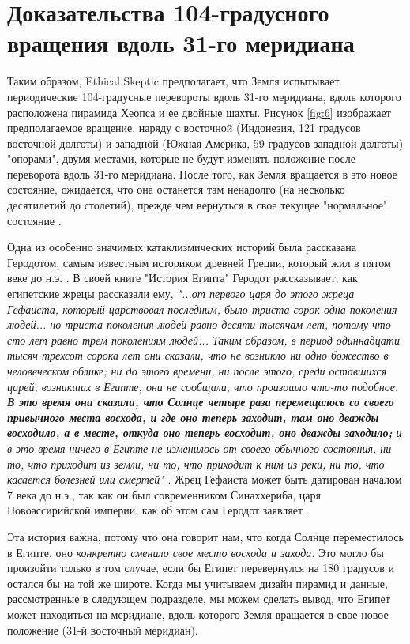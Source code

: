 \documentclass[10pt,twocolumn,letterpaper]{article}
\begin{document}
\section{Доказательства 104-градусного вращения вдоль 31-го меридиана}

Таким образом, Ethical Skeptic предполагает, что Земля испытывает периодические 104-градусные перевороты вдоль 31-го меридиана, вдоль которого расположена пирамида Хеопса и ее двойные шахты. Рисунок \ref{fig:6} изображает предполагаемое вращение, наряду с восточной (Индонезия, 121 градусов восточной долготы) и западной (Южная Америка, 59 градусов западной долготы) "опорами", двумя местами, которые не будут изменять положение после переворота вдоль 31-го меридиана. После того, как Земля вращается в это новое состояние, ожидается, что она останется там ненадолго (на несколько десятилетий до столетий), прежде чем вернуться в свое текущее "нормальное" состояние \cite{150}.

Одна из особенно значимых катаклизмических историй была рассказана Геродотом, самым известным историком древней Греции, который жил в пятом веке до н.э. \cite{31}. В своей книге "История Египта" Геродот рассказывает, как египетские жрецы рассказали ему, \textit{"...от первого царя до этого жреца Гефаиста, который царствовал последним, было триста сорок одна поколения людей... но триста поколения людей равно десяти тысячам лет, потому что сто лет равно трем поколениям людей... Таким образом, в период одиннадцати тысяч трехсот сорока лет они сказали, что не возникло ни одно божество в человеческом облике; ни до этого времени, ни после этого, среди оставшихся царей, возникших в Египте, они не сообщали, что произошло что-то подобное. \textbf{В это время они сказали, что Солнце четыре раза перемещалось со своего привычного места восхода, и где оно теперь заходит, там оно дважды восходило, а в месте, откуда оно теперь восходит, оно дважды заходило;} и в это время ничего в Египте не изменилось от своего обычного состояния, ни то, что приходит из земли, ни то, что приходит к ним из реки, ни то, что касается болезней или смертей"} \cite{32}. Жрец Гефаиста может быть датирован началом 7 века до н.э., так как он был современником Синаххериба, царя Новоассирийской империи, как об этом сам Геродот заявляет \cite{32,33,34}.

Эта история важна, потому что она говорит нам, что когда Солнце переместилось в Египте, оно \textit{конкретно сменило свое место восхода и захода}. Это могло бы произойти только в том случае, если бы Египет перевернулся на 180 градусов и остался бы на той же широте. Когда мы учитываем дизайн пирамид и данные, рассмотренные в следующем подразделе, мы можем сделать вывод, что Египет может находиться на меридиане, вдоль которого Земля вращается в свое новое положение (31-й восточный меридиан).
\end{document}
